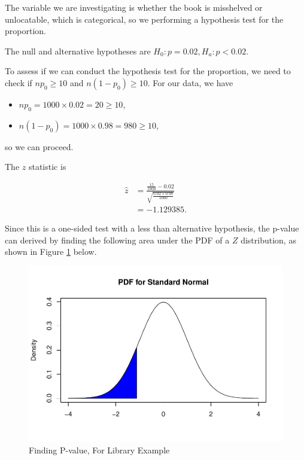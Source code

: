 \documentclass[
]{book}
\providecommand{\tightlist}{%
  \setlength{\itemsep}{0pt}\setlength{\parskip}{0pt}}
\begin{document}
The variable we are investigating is whether the book is misshelved or unlocatable, which is categorical, so we performing a hypothesis test for the proportion.

The null and alternative hypotheses are \(H_0: p = 0.02, H_a: p < 0.02\).

To assess if we can conduct the hypothesis test for the proportion, we need to check if \(n p_0 \geq 10\) and \(n(1-p_0) \geq 10\). For our data, we have

\begin{itemize}
\tightlist
\item
  \(n p_0 = 1000 \times 0.02 = 20 \geq 10\),
\item
  \(n (1-p_0) = 1000 \times 0.98 = 980 \geq 10\),
\end{itemize}

so we can proceed.

The \(z\) statistic is

\[
\begin{split}
\hat{z} &= \frac{\frac{15}{1000} - 0.02}{\sqrt{\frac{0.02 \times 0.98}{1000}}} \\
        &= -1.129385.
\end{split}
\]

Since this is a one-sided test with a less than alternative hypothesis, the p-value can derived by finding the following area under the PDF of a \(Z\) distribution, as shown in Figure \ref{fig:9-pvalworked2} below.

\begin{figure}
\centering
\includegraphics{bookdown-demo_files/figure-latex/9-pvalworked2-1.pdf}
\caption{\label{fig:9-pvalworked2}Finding P-value, For Library Example}
\end{figure}
\end{document}
